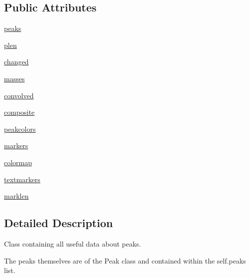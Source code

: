 \subsection*{Public Attributes}
\begin{DoxyCompactItemize}
\item 
\hyperlink{class_uni_dec_1_1unidec__modules_1_1peakstructure_1_1_peaks_a8d0a51ce1d4fa8c6ec1273988e665031}{peaks}
\item 
\hyperlink{class_uni_dec_1_1unidec__modules_1_1peakstructure_1_1_peaks_a3a53bccc6787d4c39cf92fc7bc993de3}{plen}
\item 
\hyperlink{class_uni_dec_1_1unidec__modules_1_1peakstructure_1_1_peaks_aa34b2aa868df25d6d714edb24c32a665}{changed}
\item 
\hyperlink{class_uni_dec_1_1unidec__modules_1_1peakstructure_1_1_peaks_aa78b4602e751f32c75d204c37f731838}{masses}
\item 
\hyperlink{class_uni_dec_1_1unidec__modules_1_1peakstructure_1_1_peaks_a0bc9ebfe0ea572557391188ed554ed88}{convolved}
\item 
\hyperlink{class_uni_dec_1_1unidec__modules_1_1peakstructure_1_1_peaks_a133c195ad824ff3232fac2a5e0bd6ac7}{composite}
\item 
\hyperlink{class_uni_dec_1_1unidec__modules_1_1peakstructure_1_1_peaks_a3b52ae4a18d89232a8cb8391a0452cda}{peakcolors}
\item 
\hyperlink{class_uni_dec_1_1unidec__modules_1_1peakstructure_1_1_peaks_a4b8e165c285297c676d6eb4c2d13cee5}{markers}
\item 
\hyperlink{class_uni_dec_1_1unidec__modules_1_1peakstructure_1_1_peaks_a97d0ecc6fe0914ffc69c5ab649bcd5d5}{colormap}
\item 
\hyperlink{class_uni_dec_1_1unidec__modules_1_1peakstructure_1_1_peaks_ac5ea92f95a9439fdc932aae073c96a70}{textmarkers}
\item 
\hyperlink{class_uni_dec_1_1unidec__modules_1_1peakstructure_1_1_peaks_a4b7dc56a2ee962c23c17a3bb25da0db5}{marklen}
\end{DoxyCompactItemize}


\subsection{Detailed Description}
\begin{DoxyVerb}Class containing all useful data about peaks.

The peaks themselves are of the Peak class and contained within the self.peaks list.
\end{DoxyVerb}
 

